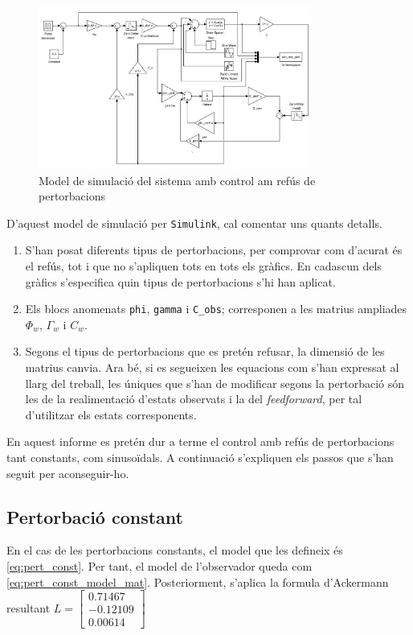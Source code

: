 \documentclass[12pt,a4paper,final,twoside,openright]{report}
\begin{document}
\begin{figure}[ht]
\centering
\includegraphics[width=0.8\textwidth]{Imatges/pert_sim.pdf}
\caption{Model de simulació del sistema amb control am refús de pertorbacions\label{fig:pert_sim}}
\end{figure}

D'aquest model de simulació per \texttt{Simulink}, cal comentar uns quants detalls.
\begin{enumerate}
\item S'han posat diferents tipus de pertorbacions, per comprovar com d'acurat és el refús, tot i que no s'apliquen tots en tots els gràfics. En cadascun dels gràfics s'especifica quin tipus de pertorbacions s'hi han aplicat.
\item Els blocs anomenats \texttt{phi}, \texttt{gamma} i \texttt{C\_obs}; corresponen a les matrius ampliades $\Phi_w$, $\Gamma_w$ i $C_w$.
\item Segons el tipus de pertorbacions que es pretén refusar, la dimensió de les matrius canvia. Ara bé, si es segueixen les equacions com s'han expressat al llarg del treball, les úniques que s'han de modificar segons la pertorbació són les de la realimentació d'estats observats i la del \textit{feedforward}, per tal d'utilitzar els estats corresponents.
\end{enumerate}

En aquest informe es pretén dur a terme el control amb refús de pertorbacions tant constants, com sinusoïdals. A continuació s'expliquen els passos que s'han seguit per aconseguir-ho.

\subsection{Pertorbació constant}

En el cas de les pertorbacions constants, el model que les defineix és \eqref{eq:pert_const}. Per tant, el model de l'observador queda com \eqref{eq:pert_const_model_mat}. Posteriorment, s'aplica la formula d'Ackermann resultant $L=\begin{bmatrix}
0.71467\\
-0.12109\\
0.00614
\end{bmatrix}$
\end{document}
